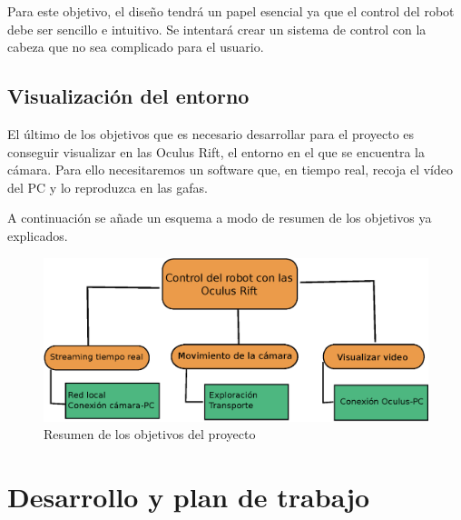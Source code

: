 \documentclass[twoside, 11pt]{epstfg}
\begin{document}
Para este objetivo, el diseño tendrá un papel esencial ya que el control del robot debe ser sencillo e intuitivo. Se intentará crear un sistema de control con la cabeza que no sea complicado para el usuario.

\subsection{Visualización del entorno}
El último de los objetivos que es necesario desarrollar para el proyecto es conseguir visualizar en las Oculus Rift, el entorno en el que se encuentra la cámara.
Para ello necesitaremos un software que, en tiempo real, recoja el vídeo del PC y lo reproduzca en las gafas. 

A continuación se añade un esquema a modo de resumen de los objetivos ya explicados.

\begin{figure}[h!]
	\centerline{
		\mbox{\includegraphics[width=6.50in]{images/Objs.eps}}
	}
	\caption{Resumen de los objetivos del proyecto}
	\label{objetivos}
\end{figure}


\newpage
\section{Desarrollo y plan de trabajo}
\end{document}
